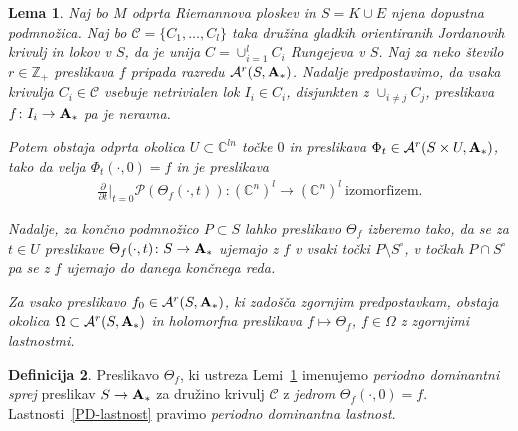 \documentclass[12pt,a4paper,twoside]{article}
\theoremstyle{definition} %
\newtheorem{definicija}{Definicija}[section]
\theoremstyle{plain} %
\newtheorem{lema}[definicija]{Lema}
\numberwithin{equation}{section}  %
\newcommand{\Z}{\mathbb Z}
\newcommand{\C}{\mathbb C}
\begin{document}
\begin{lema} \label{lema:P-D-sprej}
Naj bo $M$ odprta Riemannova ploskev in $S = K \cup E$ njena dopustna podmnožica. Naj bo $\mathcal{C} = \{C_1, \dots , C_{l} \}$ taka družina gladkih orientiranih Jordanovih krivulj in lokov v $S$, da je unija $C = \cup_{i=1}^{l} C_{i}$ Rungejeva v $S$.
Naj za neko število $r \in \Z_{+}$ preslikava $f$ pripada razredu $\mathcal{A}^{r}(S, \textbf{\textup{A}}_{*})$.
Nadalje predpostavimo, da vsaka krivulja $C_{i} \in \mathcal{C}$ vsebuje netrivialen lok $I_{i} \in C_{i}$, disjunkten z $\cup_{i \neq j}C_{j}$, preslikava $f \colon I_{i} \to \textbf{\textup{A}}_{*}$ pa je neravna.

Potem obstaja odprta okolica $U \subset \C^{ln}$ točke $0$ in preslikava $\Phi_{t} \in \mathcal{A}^{r} (S \times U, \textbf{\textup{A}}_{*})$, tako da velja
$\Phi_{t}(\cdot, 0) = f$ in je preslikava
\begin{align} \label{PD-lastnost}
	 \frac{\partial}{\partial t} \Big|_{t=0} \mathcal{P}(\Theta_{f}(\cdot, t)) \colon (\C^{n})^{l} \to (\C^{n})^{l} \ \text{izomorfizem.}
\end{align}

Nadalje, za končno podmnožico $P \subset S$ lahko preslikavo $\Theta_{f}$ izberemo tako, da se za $t \in U$ preslikave $\Theta_{f}(\cdot, t) \colon S \to\textbf{\textup{A}}_{*}$ ujemajo z $f$ v vsaki točki $P \setminus S^\circ$, v točkah $P \cap S^\circ$ pa se z $f$ ujemajo do danega končnega reda.

Za vsako preslikavo $f_{0} \in \mathcal{A}^{r}(S, \textbf{\textup{A}}_{*})$, ki zadošča zgornjim predpostavkam, obstaja okolica $\Omega \subset \mathcal{A}^{r}(S, \textbf{\textup{A}}_{*})$ in holomorfna preslikava $f \mapsto \Theta_{f}$, $f \in \Omega$ z zgornjimi lastnostmi.
\end{lema}

\begin{definicija}
Preslikavo $\Theta_{f}$, ki ustreza Lemi~\ref{lema:P-D-sprej} imenujemo \emph{periodno dominantni sprej} preslikav $S \to \textbf{\textup{A}}_{*}$ za družino krivulj $\mathcal{C}$ z \emph{jedrom} $\Theta_{f}(\cdot, 0) = f$. Lastnosti~\ref{PD-lastnost} pravimo \emph{periodno dominantna lastnost}.
\end{definicija}
\end{document}
